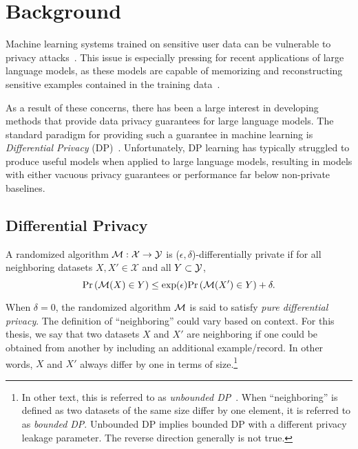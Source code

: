 \chapter{Background}\label{ch_2}


Machine learning systems trained on sensitive user data can be vulnerable to privacy attacks~\citep{shokri2017membership,hayes2019logan}.
This issue is especially pressing for recent applications of large language models, as these models are capable of memorizing and reconstructing sensitive examples contained in 
the training data~\citep{DBLP:journals/corr/ZhangBHRV16, carlini2020extracting}.

As a result of these concerns, there has been a large interest in developing
methods that provide data privacy guarantees for large language models.
The standard paradigm for providing such a guarantee in machine learning is \textit{Differential Privacy} (DP)~\citep{dwork2006calibrating,dwork2014algorithmic}.
Unfortunately, DP learning has typically struggled to produce useful models when applied to large language models, resulting in models with either vacuous privacy guarantees \citep{dupuy2021efficient} or performance far below non-private baselines.

\section{Differential Privacy}

\begin{defi}[Approximate-DP]
A randomized algorithm $\mathcal{M}: \mathcal{X} \to \mathcal{Y}$ is ($\epsilon, \delta$)-differentially private if for all neighboring datasets $X, X'\in\mathcal{X}$ and all $Y \subset \mathcal{Y}$, 
$$
\mathrm{Pr}\left(\mathcal{M}(X) \in Y\right) \le \exp( \epsilon ) \mathrm{Pr}\left( \mathcal{M}(X') \in Y \right) + \delta.
\label{eq:epsilon_delta_dp}
$$
\end{defi}
When $\delta=0$, the randomized algorithm $\mathcal{M}$ is said to satisfy \emph{pure differential privacy}.
The definition of ``neighboring'' could vary based on context. 
For this thesis, we say that two datasets $X$ and $X'$ are neighboring if one could be obtained from
another by including an additional example/record. 
In other words, $X$ and $X'$ always differ by one in terms of size.\footnote{
In other text, this is referred to as \emph{unbounded DP}~\cite{kifer2011no}. When ``neighboring'' is defined as two datasets of the same size differ by one element, it is referred to as \emph{bounded DP}.
Unbounded DP implies bounded DP with a different privacy leakage parameter.
The reverse direction generally is not true.
}


